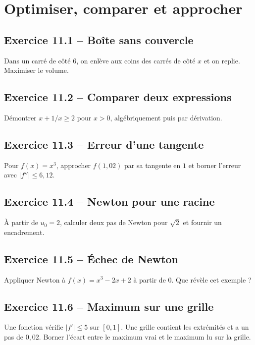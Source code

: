 \chapter{Optimiser, comparer et approcher}
\section*{Exercice 11.1 -- Boîte sans couvercle}
Dans un carré de côté $6$, on enlève aux coins des carrés de côté $x$ et on replie. Maximiser le volume.

\section*{Exercice 11.2 -- Comparer deux expressions}
Démontrer $x+1/x\ge2$ pour $x>0$, algébriquement puis par dérivation.

\section*{Exercice 11.3 -- Erreur d'une tangente}
Pour $f(x)=x^3$, approcher $f(1{,}02)$ par sa tangente en $1$ et borner l'erreur avec $|f''|\le6{,}12$.

\section*{Exercice 11.4 -- Newton pour une racine}
À partir de $u_0=2$, calculer deux pas de Newton pour $\sqrt2$ et fournir un encadrement.

\section*{Exercice 11.5 -- Échec de Newton}
Appliquer Newton à $f(x)=x^3-2x+2$ à partir de $0$. Que révèle cet exemple ?

\section*{Exercice 11.6 -- Maximum sur une grille}
Une fonction vérifie $|f'|\le5$ sur $[0,1]$. Une grille contient les extrémités et a un pas de $0{,}02$. Borner l'écart entre le maximum vrai et le maximum lu sur la grille.
